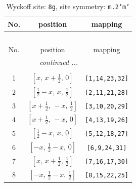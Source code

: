 \documentclass[fleqn,8pt]{jsarticle}
\begin{document}
\begin{longtable}{ccc}
\caption{Wyckoff site: {\tt 8g}, site symmetry: {\tt m.2'm'}}
 \\
 \hline \hline
No. & position & mapping \\ \hline \endfirsthead

\multicolumn{2}{l}{\tablename\ \thetable{}} \\
 \hline \hline
No. & position & mapping \\ \hline \endhead

 \hline \hline
\multicolumn{2}{r}{\footnotesize\it continued ...} \\ \endfoot

 \hline \hline
\multicolumn{2}{r}{} \\ \endlastfoot

1 & $\left[ x,\, x + \frac{1}{2},\, 0 \right]$ & {\tt [1,14,23,32]} \\ \hline
2 & $\left[ \frac{1}{2} - x,\, x,\, \frac{1}{2} \right]$ & {\tt [2,11,21,28]} \\ \hline
3 & $\left[ x + \frac{1}{2},\, - x,\, \frac{1}{2} \right]$ & {\tt [3,10,20,29]} \\ \hline
4 & $\left[ x + \frac{1}{2},\, - x,\, 0 \right]$ & {\tt [4,13,19,26]} \\ \hline
5 & $\left[ \frac{1}{2} - x,\, x,\, 0 \right]$ & {\tt [5,12,18,27]} \\ \hline
6 & $\left[ - x,\, \frac{1}{2} - x,\, 0 \right]$ & {\tt [6,9,24,31]} \\ \hline
7 & $\left[ x,\, x + \frac{1}{2},\, \frac{1}{2} \right]$ & {\tt [7,16,17,30]} \\ \hline
8 & $\left[ - x,\, \frac{1}{2} - x,\, \frac{1}{2} \right]$ & {\tt [8,15,22,25]} \\
\end{longtable}
\renewcommand{\arraystretch}{1.2}
\end{document}
